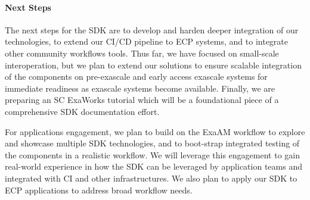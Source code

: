 \paragraph{Next Steps}


The next steps for the SDK are to develop and harden deeper 
integration of our technologies, to extend our CI/CD pipeline to ECP systems,
and to integrate other community workflows tools.
Thus far, we have focused on small-scale interoperation, but we plan to extend our solutions to
ensure scalable integration of the components on pre-exascale and early access exascale
systems for immediate readiness as exascale systems become available.
Finally, we are preparing an SC ExaWorks tutorial which will be a foundational piece of a comprehensive
SDK documentation effort.

For applications engagement, we plan to build on the ExaAM workflow to explore
and showcase multiple SDK technologies, and to boot-strap integrated testing of
the components in a realistic workflow. We will leverage this engagement to
gain real-world experience in how the SDK can be leveraged by application teams
and integrated with CI and other infrastructures.  We also plan to apply our
SDK to ECP applications to address broad workflow needs.
